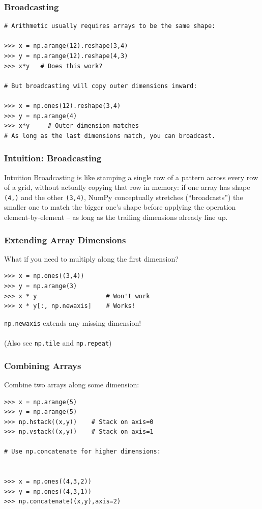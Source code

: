 \begin{frame}[fragile]\frametitle{Broadcasting}

    \begin{lstlisting}
# Arithmetic usually requires arrays to be the same shape:

>>> x = np.arange(12).reshape(3,4)
>>> y = np.arange(12).reshape(4,3)
>>> x*y   # Does this work?

# But broadcasting will copy outer dimensions inward:

>>> x = np.ones(12).reshape(3,4)
>>> y = np.arange(4)
>>> x*y     # Outer dimension matches
# As long as the last dimensions match, you can broadcast.

    \end{lstlisting}
\end{frame}

\begin{frame}[fragile]\frametitle{Intuition: Broadcasting}
\begin{block}{Intuition}
Broadcasting is like stamping a single row of a pattern across every row of a grid, without
actually copying that row in memory: if one array has shape \texttt{(4,)} and the other
\texttt{(3,4)}, NumPy conceptually stretches (``broadcasts'') the smaller one to match the
bigger one's shape before applying the operation element-by-element -- as long as the trailing
dimensions already line up.
\end{block}
\end{frame}

\begin{frame}[fragile]\frametitle{Extending Array Dimensions}

    What if you need to multiply along the first dimension?
    \begin{lstlisting}
>>> x = np.ones((3,4))
>>> y = np.arange(3)
>>> x * y                   # Won't work
>>> x * y[:, np.newaxis]    # Works!
    \end{lstlisting}
    \lstinline|np.newaxis| extends any missing dimension!
    \\~\\
    (Also see \lstinline|np.tile| and \lstinline|np.repeat|)
\end{frame}

\begin{frame}[fragile]\frametitle{Combining Arrays}

    Combine two arrays along some dimension:
    \begin{lstlisting}
>>> x = np.arange(5)
>>> y = np.arange(5)
>>> np.hstack((x,y))    # Stack on axis=0
>>> np.vstack((x,y))    # Stack on axis=1

# Use np.concatenate for higher dimensions:


>>> x = np.ones((4,3,2))
>>> y = np.ones((4,3,1))
>>> np.concatenate((x,y),axis=2)
    \end{lstlisting}
\end{frame}

